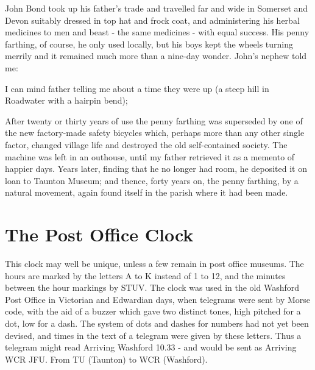 John Bond took up his father's trade and travelled far and wide in Somerset and Devon suitably dressed in top hat and frock coat, and administering his herbal medicines to men and beast - the same medicines - with equal success. His penny farthing, of course, he only used locally, but his boys kept the wheels turning merrily and it remained much more than a nine-day wonder. John's nephew told me:

I can mind father telling me about a time they were up  (a steep hill in Roadwater with a hairpin bend);

\begin{quote}
\end{quote}
 
 
After twenty or thirty years of use the penny farthing was superseded by one of the new factory-made safety bicycles which, perhaps more than any other single factor, changed village life and destroyed the old self-contained society. The machine was left in an outhouse, until my father retrieved it as a memento of happier days. Years later, finding that he no longer had room, he deposited it on loan to Taunton Museum; and thence, forty years on, the penny farthing, by a natural movement, again found itself in the parish where it had been made.
 
\section{The Post Office Clock}

This clock may well be unique, unless a few remain in post office museums. The hours are marked by the letters A to K instead of 1 to 12, and the minutes between the hour markings by STUV. The clock was used in the old Washford Post Office in Victorian and Edwardian days, when telegrams were sent by Morse code, with the aid of a buzzer which gave two distinct tones, high pitched for a dot, low for a dash. The system of dots and dashes for numbers had not yet been devised, and times in the text of a telegram were given by these letters. Thus a telegram might read Arriving Washford 10.33 - and would be sent as Arriving WCR JFU. From TU (Taunton) to WCR (Washford).

